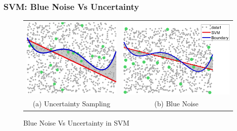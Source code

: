 \documentclass[11pts]{beamer}
\begin{document}

\begin{frame}%
\frametitle{SVM: Blue Noise Vs Uncertainty}
\begin{figure}[ht]
 \begin{tabular}{cc}
   \includegraphics[scale=0.425]{BN_VS_UN/UN.png} &
    \includegraphics[scale=0.35]{BN_VS_UN/SVM_BN.png}
   \\
    (a) Uncertainty Sampling & (b) Blue Noise\\
 \end{tabular}
 \bigskip
 \caption{Blue Noise Vs Uncertainty in SVM}
\end{figure}
\end{frame}
\end{document}
